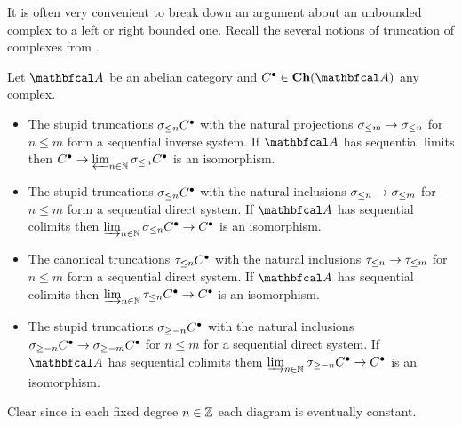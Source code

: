 It is often very convenient to break down an argument about an unbounded complex to a left or right bounded one. Recall the several notions of truncation of complexes from \cite[\href{https://stacks.math.columbia.edu/tag/0118}{Tag 0118}]{stacks-project}.
\begin{lemma}
	\label{lemma: a complex as a (co)limit of its truncations}
	
	Let $\category{A}$ be an abelian category and $C^\bullet \in \complexes{\category{A}}$ any complex.
	\begin{itemize}
		\item
		The stupid truncations ${\sigma_{\le n}}C^\bullet$ with the natural projections ${\sigma_{\le m}} \to {\sigma_{\le n}}$ for $n\le m$ form a sequential inverse system. If $\category{A}$ has sequential limits then $C^\bullet \to \varprojlim_{n\in {\mathbb{N}}} {\sigma_{\le n}} C^\bullet$ is an isomorphism.
		
		\item
		The stupid truncations ${\sigma_{\le n}}C^\bullet$ with the natural inclusions ${\sigma_{\le n}} \to {\sigma_{\le m}}$ for $n\le m$ form a sequential direct system. If $\category{A}$ has sequential colimits then $\varinjlim_{n\in {\mathbb{N}}} {\sigma_{\le n}}C^\bullet \to C^\bullet$ is an isomorphism.
		
		\item
		The canonical truncations ${\tau_{\le n}}C^\bullet$ with the natural inclusions ${\tau_{\le n}} \to {\tau_{\le m}}$ for $n\le m$ form a sequential direct system. If $\category{A}$ has sequential colimits then $\varinjlim_{n\in {\mathbb{N}}} {\tau_{\le n}}C^\bullet \to C^\bullet$ is an isomorphism.
		
		\item
		The stupid truncations ${\sigma_{\ge -n}}C^\bullet$ with the natural inclusions ${\sigma_{\ge -n}}C^\bullet \to {\sigma_{\ge -m}}C^\bullet$ for $n\le m$ for a sequential direct system. If $\category{A}$ has sequential colimits them $\varinjlim_{n\in {\mathbb{N}}} {\sigma_{\ge -n}} C^\bullet \to C^\bullet$ is an isomorphism.
	\end{itemize}
\end{lemma}
\begin{shortproof}
	Clear since in each fixed degree $n\in {\mathbb{Z}}$ each diagram is eventually constant.
\end{shortproof}

